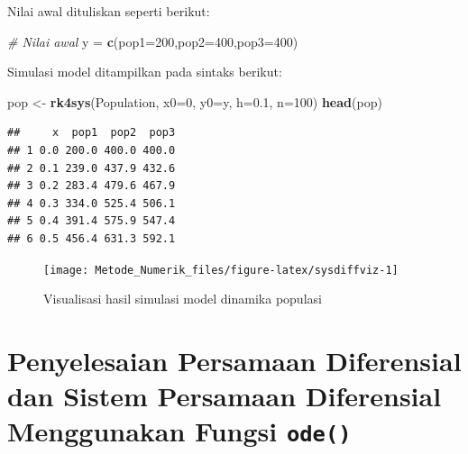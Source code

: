 \documentclass[]{book}
\newenvironment{Shaded}{\begin{snugshade}}{\end{snugshade}}
\newcommand{\CommentTok}[1]{\textcolor[rgb]{0.56,0.35,0.01}{\textit{#1}}}
\newcommand{\DataTypeTok}[1]{\textcolor[rgb]{0.13,0.29,0.53}{#1}}
\newcommand{\DecValTok}[1]{\textcolor[rgb]{0.00,0.00,0.81}{#1}}
\newcommand{\FloatTok}[1]{\textcolor[rgb]{0.00,0.00,0.81}{#1}}
\newcommand{\KeywordTok}[1]{\textcolor[rgb]{0.13,0.29,0.53}{\textbf{#1}}}
\newcommand{\NormalTok}[1]{#1}
\newcommand{\StringTok}[1]{\textcolor[rgb]{0.31,0.60,0.02}{#1}}
\theoremstyle{definition}
\theoremstyle{definition}
\theoremstyle{definition}
\theoremstyle{remark}
\begin{document}
Nilai awal dituliskan seperti berikut:

\begin{Shaded}
\begin{Highlighting}[]
\CommentTok{# Nilai awal}
\NormalTok{y =}\StringTok{ }\KeywordTok{c}\NormalTok{(}\DataTypeTok{pop1=}\DecValTok{200}\NormalTok{,}\DataTypeTok{pop2=}\DecValTok{400}\NormalTok{,}\DataTypeTok{pop3=}\DecValTok{400}\NormalTok{)}
\end{Highlighting}
\end{Shaded}

Simulasi model ditampilkan pada sintaks berikut:

\begin{Shaded}
\begin{Highlighting}[]
\NormalTok{pop <-}\StringTok{ }\KeywordTok{rk4sys}\NormalTok{(Population, }\DataTypeTok{x0=}\DecValTok{0}\NormalTok{, }\DataTypeTok{y0=}\NormalTok{y, }\DataTypeTok{h=}\FloatTok{0.1}\NormalTok{, }\DataTypeTok{n=}\DecValTok{100}\NormalTok{)}
\KeywordTok{head}\NormalTok{(pop)}
\end{Highlighting}
\end{Shaded}

\begin{verbatim}
##     x  pop1  pop2  pop3
## 1 0.0 200.0 400.0 400.0
## 2 0.1 239.0 437.9 432.6
## 3 0.2 283.4 479.6 467.9
## 4 0.3 334.0 525.4 506.1
## 5 0.4 391.4 575.9 547.4
## 6 0.5 456.4 631.3 592.1
\end{verbatim}

\begin{figure}

{\centering \texttt{[image: Metode\_Numerik\_files/figure-latex/sysdiffviz-1]} 

}

\caption{Visualisasi hasil simulasi model dinamika populasi}\label{fig:sysdiffviz}
\end{figure}

\hypertarget{penyelesaian-persamaan-diferensial-dan-sistem-persamaan-diferensial-menggunakan-fungsi-ode}{%
\section{\texorpdfstring{Penyelesaian Persamaan Diferensial dan Sistem Persamaan Diferensial Menggunakan Fungsi \texttt{ode()}}{Penyelesaian Persamaan Diferensial dan Sistem Persamaan Diferensial Menggunakan Fungsi ode()}}\label{penyelesaian-persamaan-diferensial-dan-sistem-persamaan-diferensial-menggunakan-fungsi-ode}}
\end{document}
